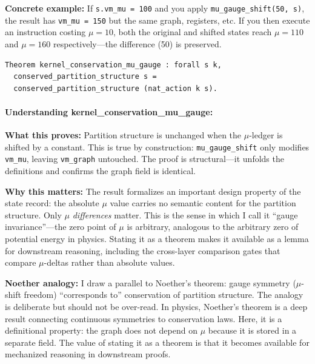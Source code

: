 \textbf{Concrete example:} If \texttt{s.vm\_mu = 100} and you apply \texttt{mu\_gauge\_shift(50, s)}, the result has \texttt{vm\_mu = 150} but the same graph, registers, etc. If you then execute an instruction costing $\mu = 10$, both the original and shifted states reach $\mu = 110$ and $\mu = 160$ respectively---the difference (50) is preserved.


\begin{theorem}
\begin{lstlisting}
Theorem kernel_conservation_mu_gauge : forall s k,
  conserved_partition_structure s = 
  conserved_partition_structure (nat_action k s).
\end{lstlisting}
\end{theorem}

\paragraph{Understanding kernel\_conservation\_mu\_gauge:}

\textbf{What this proves:} Partition structure is unchanged when the $\mu$-ledger is shifted by a constant. This is true by construction: \texttt{mu\_gauge\_shift} only modifies \texttt{vm\_mu}, leaving \texttt{vm\_graph} untouched. The proof is structural---it unfolds the definitions and confirms the graph field is identical.

\textbf{Why this matters:} The result formalizes an important design property of the state record: the absolute $\mu$ value carries no semantic content for the partition structure. Only $\mu$ \textit{differences} matter. This is the sense in which I call it ``gauge invariance''---the zero point of $\mu$ is arbitrary, analogous to the arbitrary zero of potential energy in physics. Stating it as a theorem makes it available as a lemma for downstream reasoning, including the cross-layer comparison gates that compare $\mu$-deltas rather than absolute values.

\textbf{Noether analogy:} I draw a parallel to Noether's theorem: gauge symmetry ($\mu$-shift freedom) ``corresponds to'' conservation of partition structure. The analogy is deliberate but should not be over-read. In physics, Noether's theorem is a deep result connecting continuous symmetries to conservation laws. Here, it is a definitional property: the graph does not depend on $\mu$ because it is stored in a separate field. The value of stating it as a theorem is that it becomes available for mechanized reasoning in downstream proofs.

